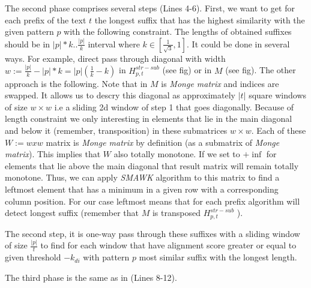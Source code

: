 The second phase comprises several steps (Lines 4-6).
First, we want to get for each prefix of the text $t$ the longest suffix that has the highest similarity with the given pattern $p$ with the following constraint.
The lengths of obtained suffixes should be in $|p|*k..\frac{|p|}{k}$ interval where $k \in [\frac{1}{\sqrt{3}},1]$.
It could be done in several ways.
For example, direct pass through diagonal with width $w:= \frac{|p|}{k} - |p|*k = |p|(\frac{1}{k} - k)$ in $H^{str-sub}_{p,t}$ (see fig) or in $M$ (see fig).
The other approach is the following.
Note that in  $M$ is \emph{Monge matrix} and indices are swapped.
It allows us to descry this diagonal as approximately $|t|$ square windows of size $w \times w$ i.e a sliding 2d window of step 1 that goes diagonally.
Because of length constraint we only interesting in elements that lie in the main diagonal and below it (remember, transposition) in these submatrices $w\times w$.
Each of these $W:=wxw$ matrix is \emph{Monge matrix} by definition (as a submatrix of \emph{Monge matrix}).
This implies that $W$ also totally monotone.
If we set to $+\inf$ for elements that lie above the main diagonal that result matrix will remain totally monotone.
Thus, we can apply \emph{SMAWK} algorithm to this matrix to find a leftmost element that has a minimum in a given row with a corresponding column position.
For our case leftmost means that for each prefix algorithm will detect longest suffix (remember that $M$ is transposed $H^{str-sub}_{p,t}$ ).

The second step, it is one-way pass through these suffixes with a sliding window of size $\frac{|p|}{t}$ to find for each window that have alignment score greater or equal to given threshold $-k_{di}$ with pattern $p$ most similar suffix with the longest length. 

The third phase is the same as in \cite{luciv2019interactive} (Lines 8-12).  



